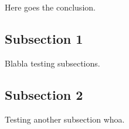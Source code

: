 Here goes the conclusion.
\subsection{Subsection 1}
Blabla testing subsections.
\subsection{Subsection 2}
Testing another subsection whoa.
